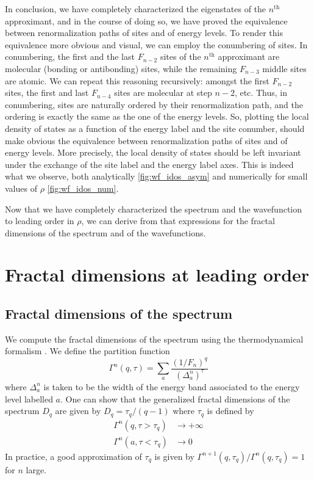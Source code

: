 \documentclass[11pt]{article}
\begin{document}
In conclusion, we have completely characterized the eigenstates of the $n^\text{th}$ approximant, and in the course of doing so, we have proved the equivalence between renormalization paths of sites and of energy levels.
To render this equivalence more obvious and visual, we can employ the conumbering of sites.
In conumbering, the first and the last $F_{n-2}$ sites of the $n^\text{th}$ approximant are molecular (bonding or antibonding) sites, while the remaining $F_{n-3}$ middle sites are atomic. 
We can repeat this reasoning recursively: amongst the first $F_{n-2}$ sites, the first and last $F_{n-4}$ sites are molecular at step $n-2$, etc. 
Thus, in conumbering, sites are naturally ordered by their renormalization path, and the ordering is exactly the same as the one of the energy levels.
So, plotting the local density of states as a function of the energy label and the site conumber, should make obvious the equivalence between renormalization paths of sites and of energy levels.
More precisely, the local density of states should be left invariant under the exchange of the site label and the energy label axes. This is indeed what we observe, both analytically \eqref{fig:wf_idos_asym} and numerically for small values of $\rho$ \eqref{fig:wf_idos_num}.

Now that we have completely characterized the spectrum and the wavefunction to leading order in $\rho$, we can derive from that expressions for the fractal dimensions of the spectrum and of the wavefunctions.

\section{Fractal dimensions at leading order}

\subsection{Fractal dimensions of the spectrum}

We compute the fractal dimensions of the spectrum using the thermodynamical formalism \cite{Halsey1986}. We define the partition function
\begin{equation}
	\Gamma^n(q,\tau) = \sum_{a} \frac{\left( 1/F_n \right)^q}{(\Delta_a^n)^\tau}
\end{equation}
where $\Delta_a^n$ is taken to be the width of the energy band associated to the energy level labelled $a$.
One can show \cite{Halsey1986} that the generalized fractal dimensions of the spectrum $D_q$ are given by $D_q = \tau_q/(q-1)$ where $\tau_q$ is defined by
\begin{align}
	\Gamma^n(q,\tau > \tau_q) &\rightarrow +\infty \\
	\Gamma^n(a,\tau < \tau_q) &\rightarrow 0
\end{align}
In practice, a good approximation of $\tau_q$ is given by $\Gamma^{n+1}(q,\tau_q)/\Gamma^n(q,\tau_q) = 1$ for $n$ large.
\end{document}
